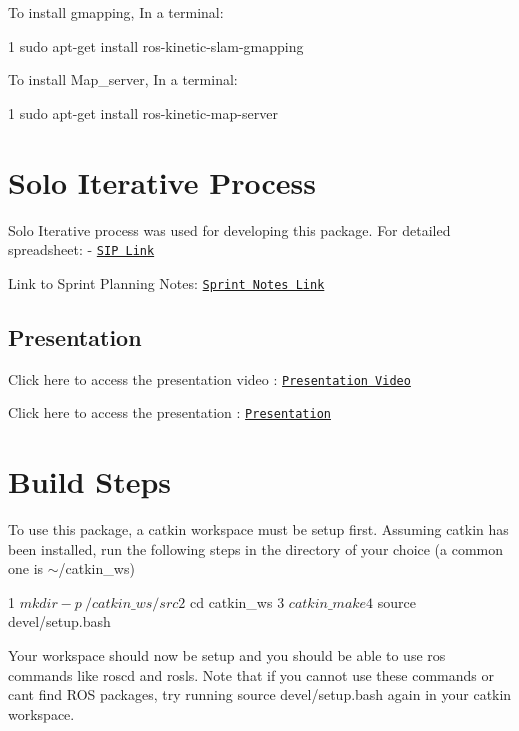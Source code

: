 To install gmapping, In a terminal\+: 
\begin{DoxyCode}
1 sudo apt-get install ros-kinetic-slam-gmapping
\end{DoxyCode}
 To install Map\+\_\+server, In a terminal\+: 
\begin{DoxyCode}
1 sudo apt-get install ros-kinetic-map-server
\end{DoxyCode}


\section*{Solo Iterative Process}

Solo Iterative process was used for developing this package. For detailed spreadsheet\+: -\/ \href{https://docs.google.com/spreadsheets/d/1GE0tzFm89GAz18CqMhIiQ6sidgq2nOKgIXCGFF8eoEM/edit?usp=sharing}{\tt S\+IP Link}

Link to Sprint Planning Notes\+: \href{https://docs.google.com/document/d/1sPE6u5NXbfY2vVXfAyPOCJBkPIRnAFAd8C1skGe4AzY/edit?usp=sharing}{\tt Sprint Notes Link}

\subsection*{Presentation}

Click here to access the presentation video \+: \href{https://youtu.be/tE91jcoHyKs}{\tt Presentation Video}

Click here to access the presentation \+: \href{https://docs.google.com/presentation/d/1mXSTLhhAfFJkN31ndFjWUDk0uE9zszrx1MzICtebjzU/edit?usp=sharing}{\tt Presentation}

\section*{Build Steps}

To use this package, a catkin workspace must be setup first. Assuming catkin has been installed, run the following steps in the directory of your choice (a common one is $\sim$/catkin\+\_\+ws) 
\begin{DoxyCode}
1 $ mkdir -p ~/catkin\_ws/src
2 $ cd catkin\_ws
3 $ catkin\_make
4 $ source devel/setup.bash
\end{DoxyCode}
 Your workspace should now be setup and you should be able to use ros commands like {\ttfamily roscd} and {\ttfamily rosls}. Note that if you cannot use these commands or can\textquotesingle{}t find R\+OS packages, try running {\ttfamily source devel/setup.\+bash} again in your catkin workspace.

